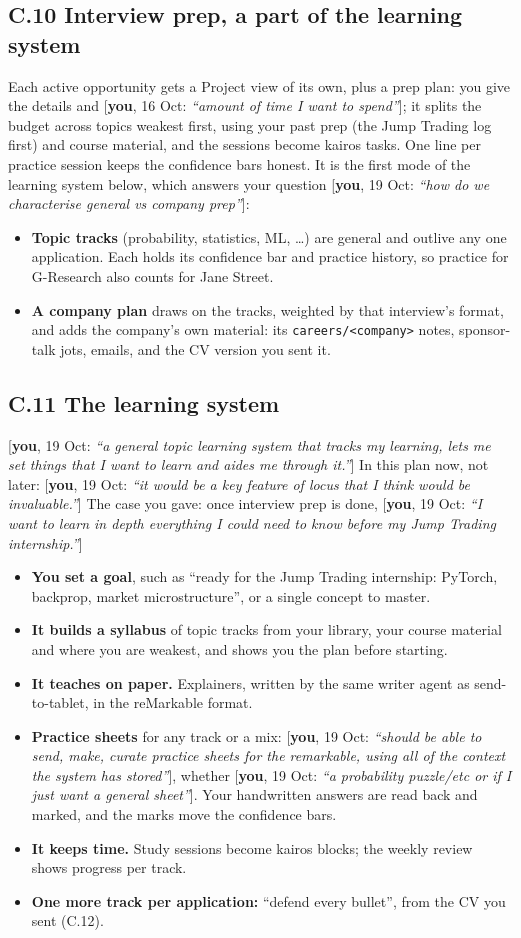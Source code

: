 \documentclass[10pt]{extarticle}
\newcommand{\you}[2]{{\small[\textbf{you}, #1: \textit{``#2''}]}}
\newcommand{\Sub}[1]{\subsection*{#1}}
\begin{document}
\Sub{C.10 Interview prep, a part of the learning system}
Each active opportunity gets a Project view of its own, plus a prep plan: you give the details and \you{16 Oct}{amount of time I want to spend}; it splits the budget across topics weakest first, using your past prep (the Jump Trading log first) and course material, and the sessions become kairos tasks. One line per practice session keeps the confidence bars honest. It is the first mode of the learning system below, which answers your question \you{19 Oct}{how do we characterise general vs company prep}:
\begin{itemize}
\item \textbf{Topic tracks} (probability, statistics, ML, \ldots) are general and outlive any one application. Each holds its confidence bar and practice history, so practice for G-Research also counts for Jane Street.
\item \textbf{A company plan} draws on the tracks, weighted by that interview's format, and adds the company's own material: its \texttt{careers/<company>} notes, sponsor-talk jots, emails, and the CV version you sent it.
\end{itemize}

\Sub{C.11 The learning system}
\you{19 Oct}{a general topic learning system that tracks my learning, lets me set things that I want to learn and aides me through it.} In this plan now, not later: \you{19 Oct}{it would be a key feature of locus that I think would be invaluable.} The case you gave: once interview prep is done, \you{19 Oct}{I want to learn in depth everything I could need to know before my Jump Trading internship.}
\begin{itemize}
\item \textbf{You set a goal}, such as ``ready for the Jump Trading internship: PyTorch, backprop, market microstructure'', or a single concept to master.
\item \textbf{It builds a syllabus} of topic tracks from your library, your course material and where you are weakest, and shows you the plan before starting.
\item \textbf{It teaches on paper.} Explainers, written by the same writer agent as send-to-tablet, in the reMarkable format.
\item \textbf{Practice sheets} for any track or a mix: \you{19 Oct}{should be able to send, make, curate practice sheets for the remarkable, using all of the context the system has stored}, whether \you{19 Oct}{a probability puzzle/etc or if I just want a general sheet}. Your handwritten answers are read back and marked, and the marks move the confidence bars.
\item \textbf{It keeps time.} Study sessions become kairos blocks; the weekly review shows progress per track.
\item \textbf{One more track per application:} ``defend every bullet'', from the CV you sent (C.12).
\end{itemize}
\end{document}

